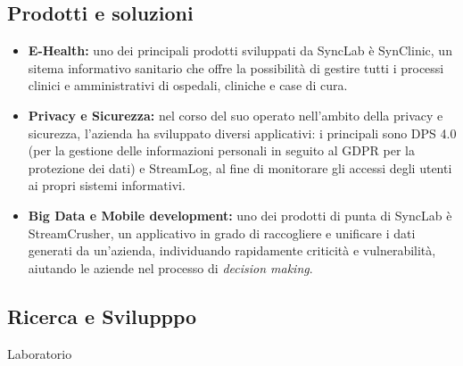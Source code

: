 \subsection{Prodotti e soluzioni}
\begin{itemize}
	\item \textbf{E-Health:} uno  dei principali prodotti sviluppati da SyncLab è SynClinic, un sitema informativo sanitario che offre la possibilità di gestire tutti i processi clinici e amministrativi di ospedali, cliniche e case di cura.
	\item \textbf{Privacy e Sicurezza:} nel corso del suo operato nell'ambito della privacy e sicurezza, l'azienda ha sviluppato diversi applicativi: i principali sono DPS 4.0 (per la gestione delle informazioni personali in seguito al GDPR per la protezione dei dati) e StreamLog, al fine di monitorare gli accessi degli utenti ai propri sistemi informativi.
	\item \textbf{Big Data e Mobile development:} uno dei prodotti di punta di SyncLab è StreamCrusher, un applicativo in grado di raccogliere e unificare i dati generati da un'azienda, individuando rapidamente criticità e vulnerabilità, aiutando le aziende nel processo di \textit{decision making}.
\end{itemize}

\subsection{Ricerca e Svilupppo}
Laboratorio
